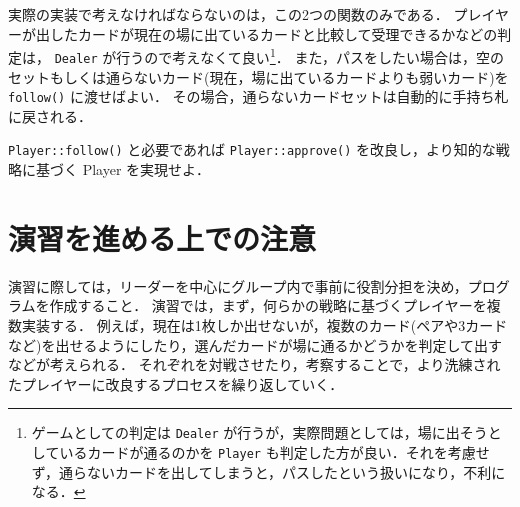 実際の実装で考えなければならないのは，この2つの関数のみである．
プレイヤーが出したカードが現在の場に出ているカードと比較して受理できるかなどの判定は， \verb+Dealer+ が行うので考えなくて良い\footnote{ゲームとしての判定は \verb+Dealer+ が行うが，実際問題としては，場に出そうとしているカードが通るのかを \verb+Player+ も判定した方が良い．それを考慮せず，通らないカードを出してしまうと，パスしたという扱いになり，不利になる．}．
また，パスをしたい場合は，空のセットもしくは通らないカード(現在，場に出ているカードよりも弱いカード)を \verb+follow()+ に渡せばよい．
その場合，通らないカードセットは自動的に手持ち札に戻される．
 
\begin{exerc}
\verb+Player::follow()+ と必要であれば \verb+Player::approve()+ を改良し，より知的な戦略に基づく Player を実現せよ． 
\end{exerc}
\section*{演習を進める上での注意}
演習に際しては，リーダーを中心にグループ内で事前に役割分担を決め，プログラムを作成すること．
演習では，まず，何らかの戦略に基づくプレイヤーを複数実装する．
例えば，現在は1枚しか出せないが，複数のカード(ペアや3カードなど)を出せるようにしたり，選んだカードが場に通るかどうかを判定して出すなどが考えられる．
それぞれを対戦させたり，考察することで，より洗練されたプレイヤーに改良するプロセスを繰り返していく．

